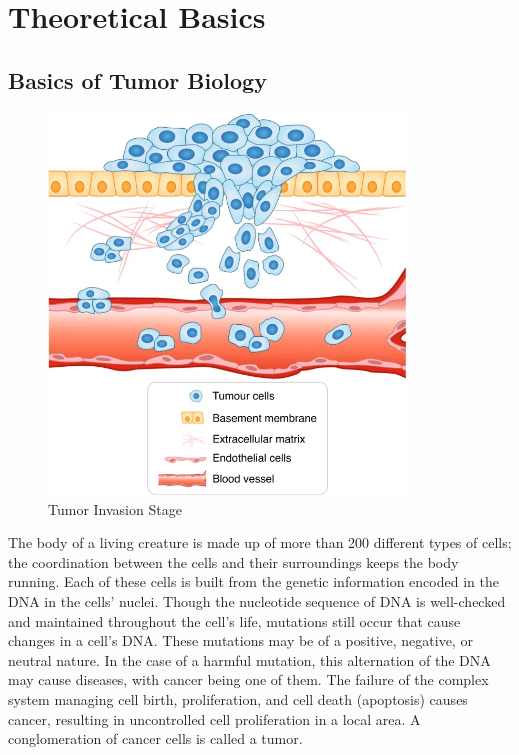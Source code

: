 \section{Theoretical Basics}
\label{sec:theoretical_basics}
\subsection{Basics of Tumor Biology}
\begin{figure}[h]
    \centering
    \includegraphics[width=0.85\textwidth]{resources/images/tumour_invasion_stage.png}
    \caption{Tumor Invasion Stage}
    \label{fig:tumor_invasion_stage}
\end{figure}

The body of a living creature is made up of more than 200 different types of cells; the coordination between the cells and their surroundings keeps the body running. Each of these cells is built from the genetic information encoded in the DNA in the cells' nuclei. Though the nucleotide sequence of DNA is well-checked and maintained throughout the cell's life, mutations still occur that cause changes in a cell's DNA. These mutations may be of a positive, negative, or neutral nature. In the case of a harmful mutation, this alternation of the DNA may cause diseases, with cancer being one of them. The failure of the complex system managing cell birth, proliferation, and cell death (apoptosis) causes cancer, resulting in uncontrolled cell proliferation in a local area. A conglomeration of cancer cells is called a tumor. 

